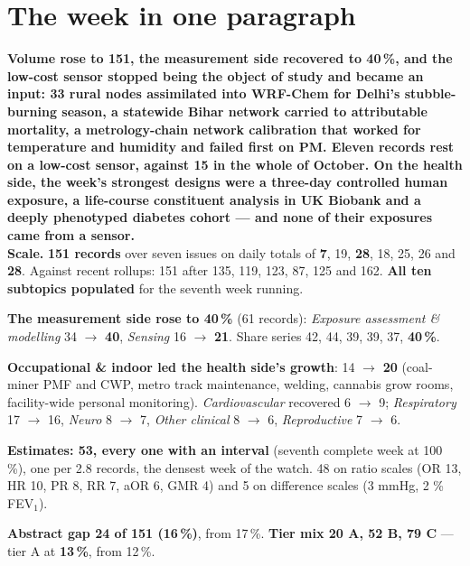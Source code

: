 \documentclass[10pt]{article}
\begin{document}
\vspace{6mm}

\section*{\sffamily\bfseries\color{Deep}The week in one paragraph}
\vspace{-1.5mm}{\color{Teal}\rule{\linewidth}{1.1pt}}\vspace{2.5mm}

\begin{keybox}
{\sffamily\bfseries\small\color{Deep}Volume rose to 151, the measurement side recovered to 40\,\%, and the low-cost
sensor stopped being the object of study and became an input: 33 rural nodes assimilated into WRF-Chem for Delhi's
stubble-burning season, a statewide Bihar network carried to attributable mortality, a metrology-chain network
calibration that worked for temperature and humidity and failed first on PM. Eleven records rest on a low-cost
sensor, against 15 in the whole of October. On the health side, the week's strongest designs were a three-day
controlled human exposure, a life-course constituent analysis in UK Biobank and a deeply phenotyped diabetes cohort
--- and none of their exposures came from a sensor.}\\[1.4mm]
\footnotesize
\textbf{Scale.} \textbf{151 records} over seven issues on daily totals of \textbf{7}, 19, \textbf{28}, 18, 25,
26 and \textbf{28}. Against recent rollups: 151 after 135, 119, 123, 87, 125 and 162. \textbf{All ten subtopics
populated} for the seventh week running.

\textbf{The measurement side rose to 40\,\%} (61 records): \textit{Exposure assessment \& modelling} 34
$\rightarrow$ \textbf{40}, \textit{Sensing} 16 $\rightarrow$ \textbf{21}. Share series 42, 44, 39, 39, 37,
\textbf{40\,\%}.

\textbf{Occupational \& indoor led the health side's growth}: 14 $\rightarrow$ \textbf{20} (coal-miner PMF and CWP,
metro track maintenance, welding, cannabis grow rooms, facility-wide personal monitoring). \textit{Cardiovascular}
recovered 6 $\rightarrow$ 9; \textit{Respiratory} 17 $\rightarrow$ 16, \textit{Neuro} 8 $\rightarrow$ 7,
\textit{Other clinical} 8 $\rightarrow$ 6, \textit{Reproductive} 7 $\rightarrow$ 6.

\textbf{Estimates: 53, every one with an interval} (seventh complete week at 100\,\%), one per 2.8 records, the
densest week of the watch. 48 on ratio scales (OR 13, HR 10, PR 8, RR 7, aOR 6, GMR 4) and 5 on difference scales
(3 mmHg, 2 \% FEV$_1$).

\textbf{Abstract gap 24 of 151 (16\,\%)}, from 17\,\%. \textbf{Tier mix 20 A, 52 B, 79 C} --- tier A at
\textbf{13\,\%}, from 12\,\%.
\end{keybox}
\end{document}
